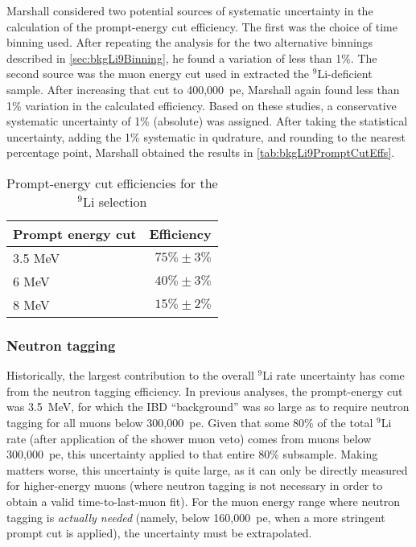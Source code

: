 \documentclass[../thesis.tex]{subfiles}
\begin{document}
Marshall considered two potential sources of systematic uncertainty in the calculation of the prompt-energy cut efficiency. The first was the choice of time binning used. After repeating the analysis for the two alternative binnings described in \autoref{sec:bkgLi9Binning}, he found a variation of less than 1\%. The second source was the muon energy cut used in extracted the $^9$Li-deficient sample. After increasing that cut to 400,000~pe, Marshall again found less than 1\% variation in the calculated efficiency. Based on these studies, a conservative systematic uncertainty of 1\% (absolute) was assigned. After taking the statistical uncertainty, adding the 1\% systematic in qudrature, and rounding to the nearest percentage point, Marshall obtained the results in \autoref{tab:bkgLi9PromptCutEffs}.

\begin{table}[h]
  \centering
  \begin{tabular}{lr}
    \toprule
    Prompt energy cut & Efficiency \\
    \midrule
    3.5 MeV & $75\% \pm 3\%$\\
    6 MeV & $40\% \pm 3\%$ \\
    8 MeV & $15\% \pm 2\%$\\
    \bottomrule
  \end{tabular}
  \caption{Prompt-energy cut efficiencies for the $^9$Li selection}
  \label{tab:bkgLi9PromptCutEffs}
\end{table}

\subsubsection{Neutron tagging}
\label{sec:bkgLi9NeuTagEff}

Historically, the largest contribution to the overall $^9$Li rate uncertainty has come from the neutron tagging efficiency. In previous analyses, the prompt-energy cut was 3.5~MeV, for which the IBD ``background'' was so large as to require neutron tagging for all muons below 300,000~pe. Given that some 80\% of the total $^9$Li rate (after application of the shower muon veto) comes from muons below 300,000~pe, this uncertainty applied to that entire 80\% subsample. Making matters worse, this uncertainty is quite large, as it can only be directly measured for higher-energy muons (where neutron tagging is not necessary in order to obtain a valid time-to-last-muon fit). For the muon energy range where neutron tagging is \emph{actually needed} (namely, below 160,000~pe, when a more stringent prompt cut is applied), the uncertainty must be extrapolated.
\end{document}

